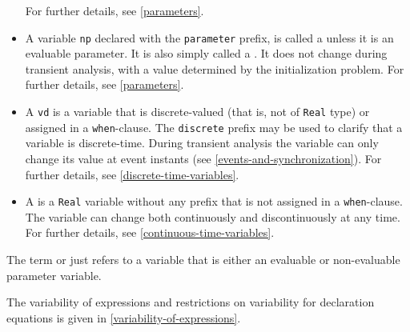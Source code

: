 \begin{itemize}
  For further details, see \ref{parameters}.
\item
  A variable \lstinline!np! declared with the \lstinline!parameter! prefix, is called a  unless it is an evaluable parameter.
  It is also simply called a .
  It does not change during transient analysis, with a value determined by the initialization problem.
  For further details, see \ref{parameters}.
\item
  A  \lstinline!vd! is a variable that is discrete-valued (that is, not of \lstinline!Real! type) or assigned in a \lstinline!when!-clause.
  The \lstinline!discrete! prefix may be used to clarify that a variable is discrete-time.
  During transient analysis the variable can only change its value at event instants (see \cref{events-and-synchronization}).
  For further details, see \ref{discrete-time-variables}.
\item
  A  is a \lstinline!Real! variable without any prefix that is not assigned in a \lstinline!when!-clause.
  The variable can change both continuously and discontinuously at any time.
  For further details, see \ref{continuous-time-variables}.
\end{itemize}

The term  or just  refers to a variable that is either an evaluable or non-evaluable parameter variable.

The variability of expressions and restrictions on variability for declaration equations is given in \cref{variability-of-expressions}.

